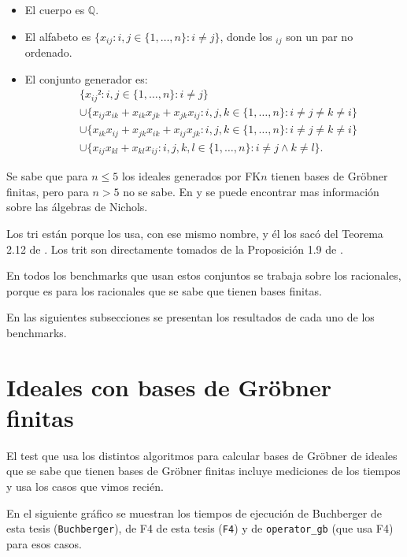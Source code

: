 \documentclass[12pt]{report}
\theoremstyle{customstyle}
\theoremstyle{factstyle}
\begin{document}
\begin{itemize}
  \item El cuerpo es $ℚ$.
  \item El alfabeto es $\{x_{ij} : i, j ∈ \{1, …, n\} : i ≠ j\}$, donde los $_{ij}$ son un par no ordenado.
  \item El conjunto generador es:
  \begin{align*}
    & \{ x_{ij}² : i, j ∈ \{1, …, n\} : i ≠ j \} \\
    & ∪ \{ x_{ij} x_{ik} + x_{ik} x_{jk} + x_{jk} x_{ij} : i, j, k ∈ \{1, …, n\} : i ≠ j ≠ k ≠ i \} \\
    & ∪ \{ x_{ik} x_{ij} + x_{jk} x_{ik} + x_{ij} x_{jk} : i, j, k ∈ \{1, …, n\} : i ≠ j ≠ k ≠ i \} \\
    & ∪ \{ x_{ij} x_{kl} + x_{kl} x_{ij} : i, j, k, l ∈ \{1, …, n\} : i ≠ j ∧ k ≠ l \} \text{.}
  \end{align*}
\end{itemize}

\noindent Se sabe que para $n ≤ 5$ los ideales generados por FK$n$ tienen bases de Gröbner finitas, pero para $n > 5$ no se sabe. En \cite{web:Nichols} y \cite{book:introNichols} se puede encontrar mas información sobre las álgebras de Nichols.

Los tri están porque \cite{thesis:Hof20} los usa, con ese mismo nombre, y él los sacó del Teorema 2.12 de \cite{book:class-tri}. Los trit son directamente tomados de la Proposición 1.9 de \cite{book:class-tri}.

En todos los benchmarks que usan estos conjuntos se trabaja sobre los racionales, porque es para los racionales que se sabe que tienen bases finitas.

En las siguientes subsecciones se presentan los resultados de cada uno de los benchmarks.

\section{Ideales con bases de Gröbner finitas}\label{section:Ideales con bases de Gröbner finitas}

El test que usa los distintos algoritmos para calcular bases de Gröbner de ideales que se sabe que tienen bases de Gröbner finitas incluye mediciones de los tiempos y usa los casos que vimos recién.

En el siguiente gráfico se muestran los tiempos de ejecución de Buchberger de esta tesis (\texttt{Buchberger}), de F4 de esta tesis (\texttt{F4}) y de \texttt{operator\_gb} (que usa F4) para esos casos.
\end{document}
